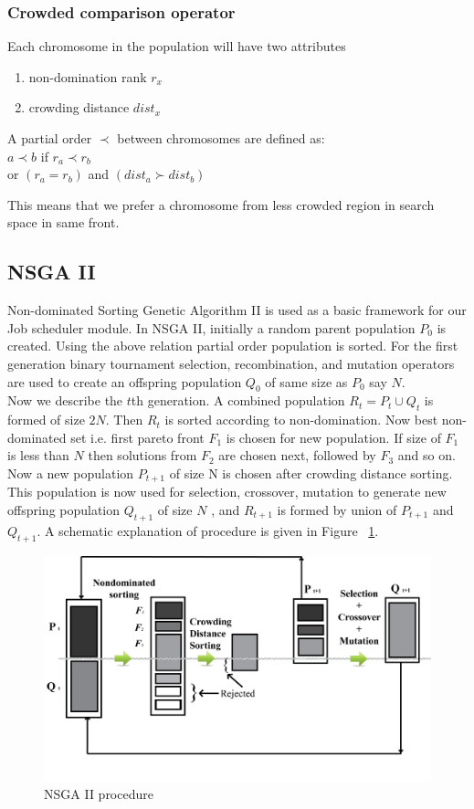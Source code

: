 \subsubsection{Crowded comparison operator}
Each chromosome in the population will have two attributes
\begin{enumerate}
\item non-domination rank $r_x$
\item crowding distance $dist_x$
\end{enumerate}
\begin{framed}
A partial order $\prec$ between chromosomes are defined as:\\
$ a \prec b $ if $r_a \prec r_b$\\
or $(r_a = r_b)$ and $(dist_a \succ dist_b)$
\end{framed}
This means that we prefer a chromosome from less crowded region in search space in same front.
\subsection{NSGA II}
Non-dominated Sorting Genetic Algorithm II \cite{deb2002fast} is used as a basic framework for our Job scheduler module. In NSGA II, initially a random parent population $P_0$ is created. Using the above relation partial order population is sorted. For the first generation binary tournament selection, recombination, and mutation operators are used to create an offspring population $Q_0$ of same size as $P_0$ say $N$.\\
Now we describe the $t$th generation. A combined population $R_t = P_t \cup Q_t$ is formed of size $2N$. Then $R_t$ is sorted according to non-domination. Now best non-dominated set i.e. first pareto front $F_1$ is chosen for new population. If size of $F_1$ is less than $N$ then solutions from $F_2$ are chosen next, followed by $F_3$ and so on. Now a new population $P_{t+1}$ of size N is chosen  after crowding distance sorting.  This population is now used for selection, crossover, mutation to generate new offspring population $Q_{t+1}$ of size $N$ , and $R_{t+1}$ is formed by union of $P_{t+1}$ and $Q_{t+1}$. A schematic explanation of procedure is given in Figure ~\ref{NSGA2}.
\begin{figure}[!h]
    \centering
    \includegraphics[width=1.0\columnwidth]{NSGA2}
    \caption{NSGA II procedure \cite{deb2002fast}}
	\label{NSGA2}
\end{figure}
